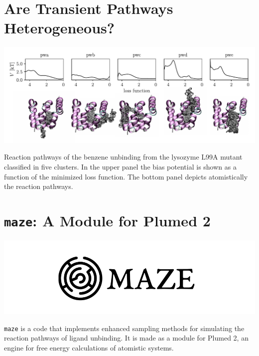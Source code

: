 \documentclass[a0,portrait]{a0poster}
\begin{document}
\begin{multicols}{2}
\section*{\huge\centering\color{myblue}Are Transient Pathways
  Heterogeneous?~\cite{3}}
\vspace*{1cm}
\begin{minipage}[b]{\linewidth}
  \centering
  \includegraphics[width=36cm]{../fig/fig_4.pdf}
\end{minipage}

\noindent Reaction pathways of the benzene unbinding from the lysozyme L99A mutant
classified in five clusters.  In the upper panel the bias potential is shown as
a function of the minimized loss function. The bottom panel depicts
atomistically the reaction pathways.

\section*{\huge\centering\color{myblue}\texttt{maze}: A Module for Plumed
2~\cite{3}}
\vspace*{1cm}
\begin{minipage}[b]{\linewidth}
  \centering
  \includegraphics[width=20cm]{../fig/maze-icon.png}
\end{minipage}
\vspace*{1cm}

\noindent\texttt{maze} is a code that implements enhanced sampling methods for simulating 
the reaction pathways of ligand unbinding. It is made as a module for Plumed 2, an
engine for free energy calculations of atomistic systems.
\vspace*{1cm}


\end{multicols}
\end{document}
